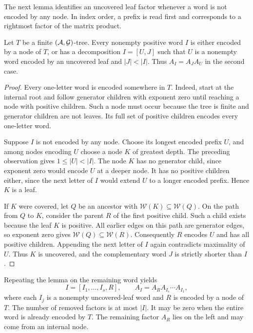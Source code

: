 The next lemma identifies an uncovered leaf factor whenever a word is not encoded by any node.
In index order, a prefix is read first and corresponds to a rightmost factor of the matrix product.

\begin{lemma}
    \label{lem:finitePrefixLeaf}
    Let $T$ be a finite $(\mathcal{A},\mathcal{G})$-tree.
    Every nonempty positive word $I$ is either encoded by a node of $T$, or has a decomposition $I=[U,J]$ such that $U$ is a nonempty word encoded by an uncovered leaf and $|J|<|I|$.
    Thus $A_I=A_JA_U$ in the second case.
\end{lemma}

\begin{proof}
    Every one-letter word is encoded somewhere in $T$.
    Indeed, start at the internal root and follow generator children with exponent zero until reaching a node with positive children.
    Such a node must occur because the tree is finite and generator children are not leaves.
    Its full set of positive children encodes every one-letter word.

    Suppose $I$ is not encoded by any node.
    Choose its longest encoded prefix $U$, and among nodes encoding $U$ choose a node $K$ of greatest depth.
    The preceding observation gives $1\leq|U|<|I|$.
    The node $K$ has no generator child, since exponent zero would encode $U$ at a deeper node.
    It has no positive children either, since the next letter of $I$ would extend $U$ to a longer encoded prefix.
    Hence $K$ is a leaf.

    If $K$ were covered, let $Q$ be an ancestor with $\mathcal{W}(K)\subseteq\mathcal{W}(Q)$.
    On the path from $Q$ to $K$, consider the parent $R$ of the first positive child.
    Such a child exists because the leaf $K$ is positive.
    All earlier edges on this path are generator edges, so exponent zero gives $\mathcal{W}(Q)\subseteq\mathcal{W}(R)$.
    Consequently $R$ encodes $U$ and has all positive children.
    Appending the next letter of $I$ again contradicts maximality of $U$.
    Thus $K$ is uncovered, and the complementary word $J$ is strictly shorter than $I$.
\end{proof}

Repeating the lemma on the remaining word yields
\[
    I=[I_1,\dots,I_s,R],\qquad
    A_I=A_RA_{I_s}\cdots A_{I_1},
\]
where each $I_j$ is a nonempty uncovered-leaf word and $R$ is encoded by a node of $T$.
The number of removed factors is at most $|I|$.
It may be zero when the entire word is already encoded by $T$.
The remaining factor $A_R$ lies on the left and may come from an internal node.

